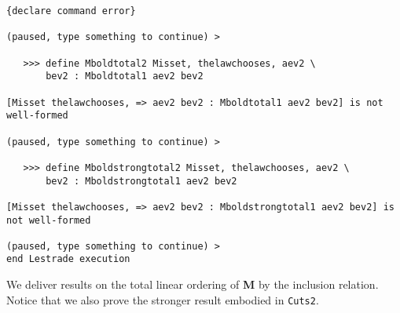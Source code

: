 \documentclass[12pt]{article}
\begin{document}
\begin{verbatim}
{declare command error}

(paused, type something to continue) >

   >>> define Mboldtotal2 Misset, thelawchooses, aev2 \
       bev2 : Mboldtotal1 aev2 bev2

[Misset thelawchooses, => aev2 bev2 : Mboldtotal1 aev2 bev2] is not well-formed

(paused, type something to continue) >

   >>> define Mboldstrongtotal2 Misset, thelawchooses, aev2 \
       bev2 : Mboldstrongtotal1 aev2 bev2

[Misset thelawchooses, => aev2 bev2 : Mboldstrongtotal1 aev2 bev2] is not well-formed

(paused, type something to continue) >
end Lestrade execution
\end{verbatim}

We deliver results on the total linear ordering of {\bf M} by the inclusion relation.  Notice that we also prove the stronger result embodied in {\tt Cuts2}.
\end{document}
